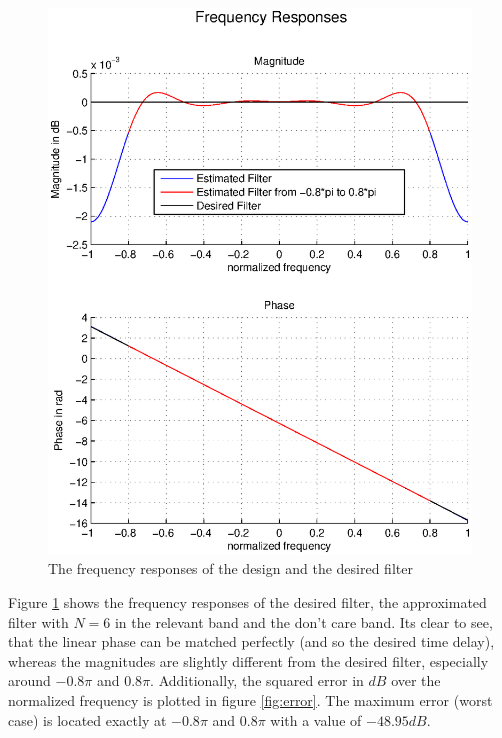 \begin{figure}[h]
\centering
\includegraphics[width=\textwidth]{pics/fig1.eps}
\caption{The frequency responses of the design and the desired filter}
\label{fig:freqz}
\end{figure}

Figure \ref{fig:freqz} shows the frequency responses of the desired filter, the approximated filter with $N=6$ in the relevant band and the don't care band. Its clear to see, that the linear phase can be matched perfectly (and so the desired time delay), whereas the magnitudes are slightly different from the desired filter, especially around $-0.8\pi$ and $0.8\pi$. Additionally, the squared error in $dB$ over the normalized frequency is plotted in figure \ref{fig:error}. The maximum error (worst case) is located exactly at $-0.8\pi$ and $0.8\pi$ with a value of $-48.95dB$.

